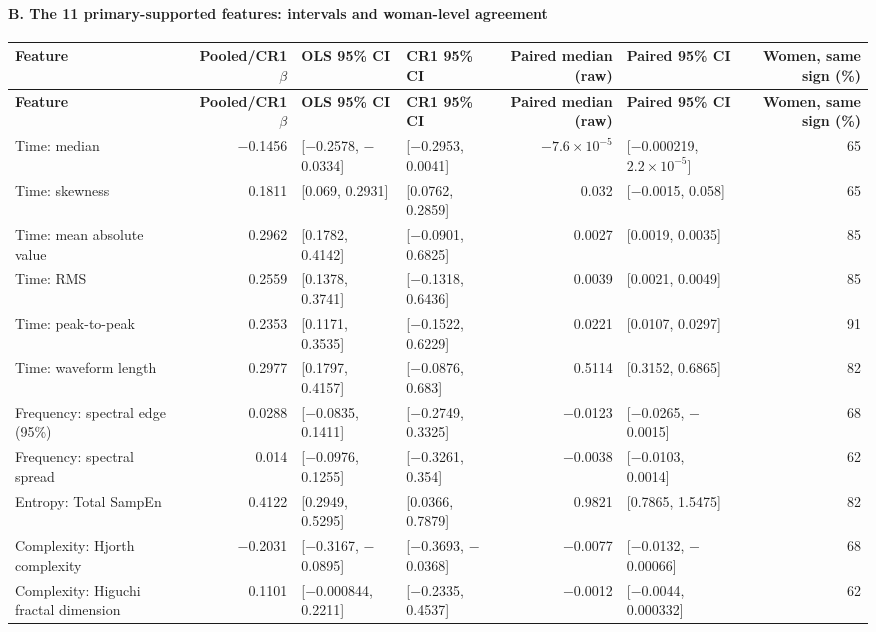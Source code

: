 \documentclass[10pt]{article}
\begin{document}
\medskip
{}\paragraph{B. The 11 primary-supported features: intervals and woman-level agreement}
\begin{longtable}{p{4.8cm}rp{3.3cm}p{3.3cm}rp{3.3cm}r}
\toprule
\textbf{Feature} & \textbf{Pooled/CR1 $\beta$} & \textbf{OLS 95\% CI} & \textbf{CR1 95\% CI} & \textbf{Paired median (raw)} & \textbf{Paired 95\% CI} & \textbf{Women, same sign (\%)} \\
\midrule
\endfirsthead
\toprule
\textbf{Feature} & \textbf{Pooled/CR1 $\beta$} & \textbf{OLS 95\% CI} & \textbf{CR1 95\% CI} & \textbf{Paired median (raw)} & \textbf{Paired 95\% CI} & \textbf{Women, same sign (\%)} \\
\midrule
\endhead
Time: median & $-$0.1456 & [$-$0.2578, $-$0.0334] & [$-$0.2953, 0.0041] & $-$$7.6\times10^{-5}$ & [$-$0.000219, $2.2\times10^{-5}$] & 65 \\
Time: skewness & 0.1811 & [0.069, 0.2931] & [0.0762, 0.2859] & 0.032 & [$-$0.0015, 0.058] & 65 \\
Time: mean absolute value & 0.2962 & [0.1782, 0.4142] & [$-$0.0901, 0.6825] & 0.0027 & [0.0019, 0.0035] & 85 \\
Time: RMS & 0.2559 & [0.1378, 0.3741] & [$-$0.1318, 0.6436] & 0.0039 & [0.0021, 0.0049] & 85 \\
Time: peak-to-peak & 0.2353 & [0.1171, 0.3535] & [$-$0.1522, 0.6229] & 0.0221 & [0.0107, 0.0297] & 91 \\
Time: waveform length & 0.2977 & [0.1797, 0.4157] & [$-$0.0876, 0.683] & 0.5114 & [0.3152, 0.6865] & 82 \\
Frequency: spectral edge (95\%) & 0.0288 & [$-$0.0835, 0.1411] & [$-$0.2749, 0.3325] & $-$0.0123 & [$-$0.0265, $-$0.0015] & 68 \\
Frequency: spectral spread & 0.014 & [$-$0.0976, 0.1255] & [$-$0.3261, 0.354] & $-$0.0038 & [$-$0.0103, 0.0014] & 62 \\
Entropy: Total SampEn & 0.4122 & [0.2949, 0.5295] & [0.0366, 0.7879] & 0.9821 & [0.7865, 1.5475] & 82 \\
Complexity: Hjorth complexity & $-$0.2031 & [$-$0.3167, $-$0.0895] & [$-$0.3693, $-$0.0368] & $-$0.0077 & [$-$0.0132, $-$0.00066] & 68 \\
Complexity: Higuchi fractal dimension & 0.1101 & [$-$0.000844, 0.2211] & [$-$0.2335, 0.4537] & $-$0.0012 & [$-$0.0044, 0.000332] & 62 \\
\bottomrule
\end{longtable}
\end{document}
